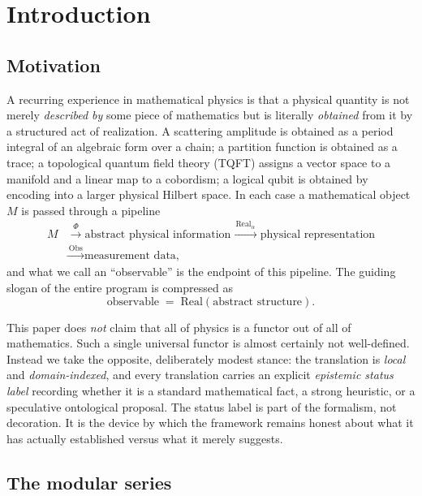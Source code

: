 \documentclass[12pt]{article}
\theoremstyle{definition}
\theoremstyle{remark}
\newcommand{\Real}{\mathrm{Real}}
\newcommand{\Obs}{\mathrm{Obs}}
\begin{document}
\tableofcontents

\section{Introduction}
\label{sec:intro}

\subsection{Motivation}

A recurring experience in mathematical physics is that a physical quantity is
not merely \emph{described by} some piece of mathematics but is literally
\emph{obtained} from it by a structured act of realization. A scattering
amplitude is obtained as a period integral of an algebraic form over a chain; a
partition function is obtained as a trace; a topological quantum field theory
(TQFT) assigns a vector space to a manifold and a linear map to a cobordism; a
logical qubit is obtained by encoding into a larger physical Hilbert space. In
each case a mathematical object $M$ is passed through a pipeline
\[
\begin{aligned}
  M &\xrightarrow{\ \Phi\ } \text{abstract physical information}
     \xrightarrow{\ \Real_\alpha\ } \text{physical representation}\\
    &\xrightarrow{\ \Obs\ } \text{measurement data,}
\end{aligned}
\]
and what we call an ``observable'' is the endpoint of this pipeline. The
guiding slogan of the entire program is compressed as
\[
  \boxed{\ \text{observable} \;=\; \Real(\text{abstract structure}).\ }
\]

This paper does \emph{not} claim that all of physics is a functor out of all of
mathematics. Such a single universal functor is almost certainly not
well-defined. Instead we take the opposite, deliberately modest stance: the
translation is \emph{local} and \emph{domain-indexed}, and every translation
carries an explicit \emph{epistemic status label} recording whether it is a
standard mathematical fact, a strong heuristic, or a speculative ontological
proposal. The status label is part of the formalism, not decoration. It is the
device by which the framework remains honest about what it has actually
established versus what it merely suggests.

\subsection{The modular series}
\end{document}
